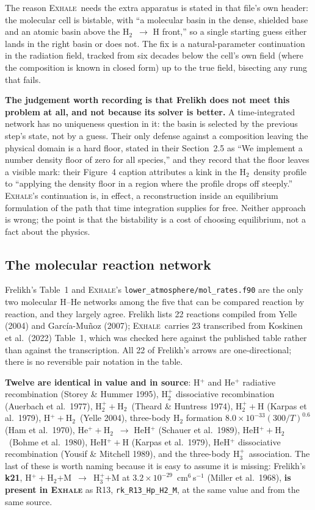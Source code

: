 \documentclass[english,a4paper]{my_memo}
\newcommand{\EXHALE}{\textsc{Exhale}}
\newcommand{\Hth}{\ensuremath{\mathrm{H}_3^+}}
\newcommand{\Htwo}{\ensuremath{\mathrm{H}_2}}
\begin{document}
The reason \EXHALE\ needs the extra apparatus is stated in that file's own
header: the molecular cell is bistable, with ``a molecular basin in the dense,
shielded base and an atomic basin above the \Htwo\ $\rightarrow$ H front,'' so
a single starting guess either lands in the right basin or does not. The fix
is a natural-parameter continuation in the radiation field, tracked from six
decades below the cell's own field (where the composition is known in
closed form) up to the true field, bisecting any rung that fails.

\textbf{The judgement worth recording is that Frelikh does not meet this
problem at all, and not because its solver is better.} A time-integrated
network has no uniqueness question in it: the basin is selected by the
previous step's state, not by a guess. Their only defense against a
composition leaving the physical domain is a hard floor, stated in their
Section~2.5 as ``We implement a number density floor of zero for all
species,'' and they record that the floor leaves a visible mark: their
Figure~4 caption attributes a kink in the \Htwo\ density profile to
``applying the density floor in a region where the profile drops off
steeply.'' \EXHALE's continuation is, in effect, a reconstruction inside an
equilibrium formulation of the path that time integration supplies for free.
Neither approach is wrong; the point is that the bistability is a cost of
choosing equilibrium, not a fact about the physics.

\subsection{The molecular reaction network}
\label{sec:network}

Frelikh's Table~1 and \EXHALE's \texttt{lower\_atmosphere/mol\_rates.f90} are
the only two molecular H--He networks among the five that can be compared
reaction by reaction, and they largely agree. Frelikh lists 22 reactions
compiled from Yelle (2004) and Garc\'ia-Mu\~noz (2007); \EXHALE\ carries 23
transcribed from Koskinen et al.\ (2022) Table~1, which was checked here
against the published table rather than against the transcription. All 22 of
Frelikh's arrows are one-directional; there is no reversible pair notation in
the table.

\textbf{Twelve are identical in value and in source}: H$^+$ and He$^+$
radiative recombination (Storey \& Hummer 1995), H$_2^+$ dissociative
recombination (Auerbach et al.\ 1977), H$_2^+ + $\Htwo\ (Theard \& Huntress
1974), H$_2^+ + $H (Karpas et al.\ 1979), H$^+ + $\Htwo\ (Yelle 2004),
three-body H$_2$ formation $8.0\times10^{-33}(300/T)^{0.6}$ (Ham et al.\
1970), He$^+ + $\Htwo\ $\rightarrow$ HeH$^+$ (Schauer et al.\ 1989),
HeH$^+ + $\Htwo\ (Bohme et al.\ 1980), HeH$^+ + $H (Karpas et al.\ 1979),
HeH$^+$ dissociative recombination (Yousif \& Mitchell 1989), and the
three-body \Hth\ association. The last of these is worth naming because it is
easy to assume it is missing: Frelikh's \textbf{k21},
H$^+ + $\Htwo$ + $M~$\rightarrow$~\Hth$ + $M at
$3.2\times10^{-29}$~cm$^6$\,s$^{-1}$ (Miller et al.\ 1968), \textbf{is present
in \EXHALE} as R13, \texttt{rk\_R13\_Hp\_H2\_M}, at the same value and from
the same source.
\end{document}
